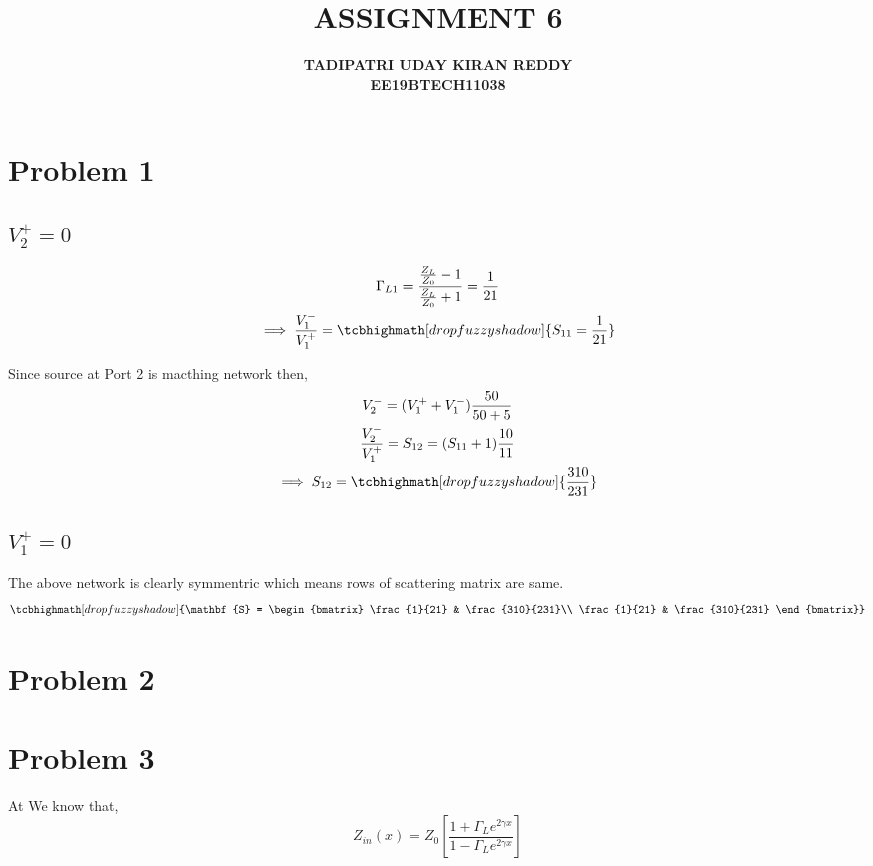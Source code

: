 \documentclass{article}
\begin{document}
\title{{\textbf{ASSIGNMENT 6}}}
\author{\textbf{TADIPATRI UDAY KIRAN REDDY}\\\textbf{EE19BTECH11038}}
\maketitle

\section*{\hfil Problem 1}
\subsection*{$V_{2}^+ = 0$}
\begin{gather}
\Gamma _{L1} = \frac{\frac{Z_L}{Z_0}-1}{\frac{Z_L}{Z_0}+1} = \frac{1}{21}\\
\implies \frac{V_1^-}{V_1^+} = \tcbhighmath[drop fuzzy shadow]{S_{11} = \frac{1}{21}}
\end{gather}

Since source at Port 2 is macthing network then,
\begin{gather}
V_2^- = (V_1^+ + V_1^-)\frac{50}{50 + 5}\\
\frac{V_2^- }{V_1^+} = S_{12} = (S_{11} + 1)\frac{10}{11}\\
\implies S_{12} = \tcbhighmath[drop fuzzy shadow]{\frac{310}{231}}
\end{gather}
\subsection*{$V_{1}^+ = 0$}
The above network is clearly symmentric which means rows of scattering matrix are same.
\begin{equation}
\tcbhighmath[drop fuzzy shadow]{\mathbf{S} = \begin{bmatrix}
\frac{1}{21} & \frac{310}{231}\\
\frac{1}{21} & \frac{310}{231}
\end{bmatrix}}
\end{equation}
\section*{\hfil Problem 2}

\section*{\hfil Problem 3}
At 
We know that,
\begin{equation}
	Z_{in}(x) = Z_0\left[\frac{1 + \Gamma _Le^{2\gamma x}}{1 - \Gamma _Le^{2\gamma x}}\right]
\end{equation}
\end{document}
